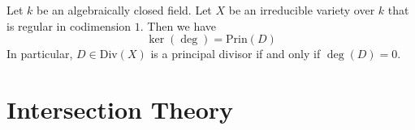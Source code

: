 \documentclass[a4paper]{article}
\begin{document}
\begin{prp}{}{} Let $k$ be an algebraically closed field. Let $X$ be an irreducible variety over $k$ that is regular in codimension $1$. Then we have $$\ker(\deg)=\text{Prin}(D)$$ In particular, $D\in\text{Div}(X)$ is a principal divisor if and only if $\deg(D)=0$. 
\end{prp}

\pagebreak
\section{Intersection Theory}
\end{document}
